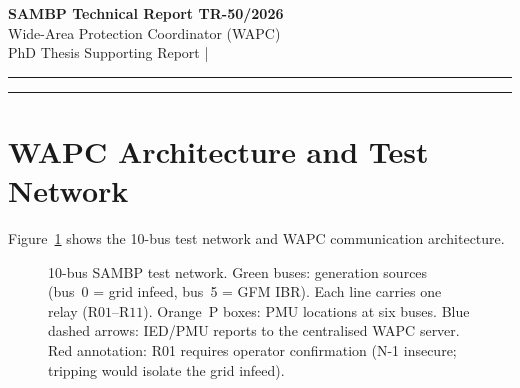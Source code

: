 \documentclass[11pt,a4paper]{article}
\begin{document}
\begin{center}
  {\LARGE\bfseries\color{sambpblue} SAMBP Technical Report TR-50/2026}\\[6pt]
  {\large Wide-Area Protection Coordinator (WAPC)}\\[10pt]
  {\normalsize PhD Thesis Supporting Report \quad|}
\end{center}

\vspace{2pt}\hrule\vspace{8pt}

\begin{abstract}
\noindent
This report develops the Wide-Area Protection Coordinator (WAPC), a
centralised decision engine that aggregates IED relay reports and PMU
synchrophasor data across a 10-bus IBR test network to deliver four
capabilities unavailable to individual relays: (i) network-wide fault
localisation, (ii) N-1 security verification before tripping, (iii)
PINN ML advisory integration, and (iv) coordinated GOOSE messaging.
Study B demonstrates 94.5\% correct-line fault localisation at standard
IEC\,Class\,P1 PMU noise ($\sigma_V=0.01$\,pu), degrading to 77.5\% at
$4\times$ noise.  Study C establishes that 10/11 relays can be tripped
without islanding risk; R01 (the only grid infeed) requires operator
confirmation.  Study D shows the WAPC centralised path adds 5.0\,ms over
distributed relaying (9.0\,ms vs 4.0\,ms), consuming 18\% of the 50\,ms
trip budget.  Study E integration test achieves 90\% WAPC accuracy and 92\%
distributed accuracy; critically, zero scenarios were wrong by both systems,
confirming that WAPC and distributed relaying are complementary rather than
competing decision paths.
\end{abstract}

\vspace{4pt}\hrule\vspace{10pt}

\section{WAPC Architecture and Test Network}
\label{sec:arch}

Figure~\ref{fig:topo} shows the 10-bus test network and WAPC communication
architecture.

\begin{figure}[htbp]
  \centering
  \resizebox{0.80\textwidth}{!}{}
  \caption{10-bus SAMBP test network.  Green buses: generation sources
           (bus~0 = grid infeed, bus~5 = GFM IBR).  Each line carries one
           relay ($\mathrm{R01}$--$\mathrm{R11}$).  Orange~P boxes: PMU
           locations at six buses.  Blue dashed arrows: IED/PMU reports to
           the centralised WAPC server.  Red annotation: R01 requires operator
           confirmation (N-1 insecure; tripping would isolate the grid infeed).}
  \label{fig:topo}
\end{figure}
\end{document}
